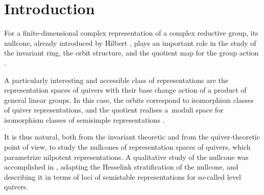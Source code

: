 \documentclass[pdftex]{sigma}
\numberwithin{equation}{section}
\theoremstyle{definition}
\begin{document}
\allowdisplaybreaks

\newcommand{\arXivNumber}{2502.02353}

\renewcommand{\PaperNumber}{020}

\FirstPageHeading









\section{Introduction}

For a finite-dimensional complex representation of a complex reductive group, its nullcone, already introduced by Hilbert \cite{H}, plays an important role in the study of the invariant ring, the orbit structure, and the quotient map for the group action \cite{KW}.

A particularly interesting and accessible class of representations are the representation spaces of quivers with their base change action of a product of general linear groups. In this case, the orbits correspond to isomorphism classes of quiver representations, and the quotient realises a~moduli space for isomorphism classes of semisimple representations \cite{LP}.

It is thus natural, both from the invariant theoretic and from the quiver-theoretic point of view, to study the nullcones of representation spaces of quivers, which parametrize nilpotent representations. A qualitative study of the nullcone was accomplished in \cite{LB}, adapting the Hesselink stratification of the nullcone, and describing it in terms of loci of semistable representations for so-called level quivers.
\end{document}
